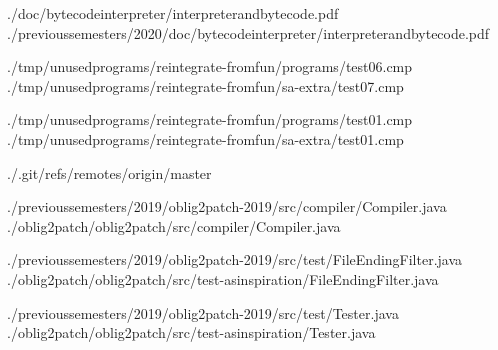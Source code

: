 

./doc/bytecodeinterpreter/interpreterandbytecode.pdf
./previoussemesters/2020/doc/bytecodeinterpreter/interpreterandbytecode.pdf

./tmp/unusedprograms/reintegrate-fromfun/programs/test06.cmp
./tmp/unusedprograms/reintegrate-fromfun/sa-extra/test07.cmp

./tmp/unusedprograms/reintegrate-fromfun/programs/test01.cmp
./tmp/unusedprograms/reintegrate-fromfun/sa-extra/test01.cmp






./.git/refs/remotes/origin/master

./previoussemesters/2019/oblig2patch-2019/src/compiler/Compiler.java
./oblig2patch/oblig2patch/src/compiler/Compiler.java

./previoussemesters/2019/oblig2patch-2019/src/test/FileEndingFilter.java
./oblig2patch/oblig2patch/src/test-asinspiration/FileEndingFilter.java

./previoussemesters/2019/oblig2patch-2019/src/test/Tester.java
./oblig2patch/oblig2patch/src/test-asinspiration/Tester.java

